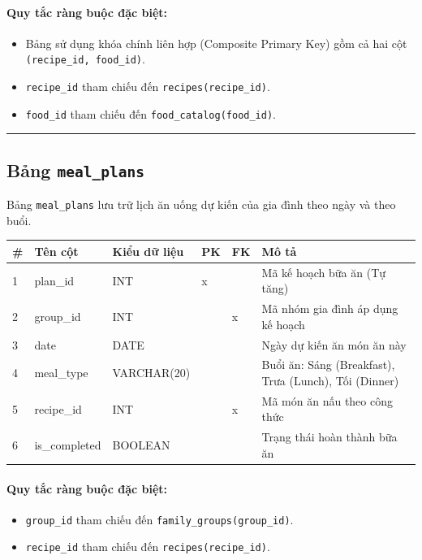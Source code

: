 \documentclass[12pt,a4paper]{article}
\begin{document}
\paragraph{Quy tắc ràng buộc đặc biệt:}
\begin{itemize}
    \item Bảng sử dụng khóa chính liên hợp (Composite Primary Key) gồm cả hai cột \texttt{(recipe\_id, food\_id)}.
    \item \texttt{recipe\_id} tham chiếu đến \texttt{recipes(recipe\_id)}.
    \item \texttt{food\_id} tham chiếu đến \texttt{food\_catalog(food\_id)}.
\end{itemize}

\vskip 0.5cm
\noindent\rule{\textwidth}{0.5pt}
\vskip 0.5cm

\subsection{Bảng \texttt{meal\_plans}}
Bảng \texttt{meal\_plans} lưu trữ lịch ăn uống dự kiến của gia đình theo ngày và theo buổi.

\begin{longtable}{|p{0.5cm}|p{3.4cm}|p{3.2cm}|p{0.7cm}|p{0.7cm}|p{3.6cm}|}
\hline
\textbf{\#} & \textbf{Tên cột} & \textbf{Kiểu dữ liệu} & \textbf{PK} & \textbf{FK} & \textbf{Mô tả} \\ \hline
\endhead
1 & plan\_id & INT & x & & Mã kế hoạch bữa ăn (Tự tăng) \\ \hline
2 & group\_id & INT & & x & Mã nhóm gia đình áp dụng kế hoạch \\ \hline
3 & date & DATE & & & Ngày dự kiến ăn món ăn này \\ \hline
4 & meal\_type & VARCHAR(20) & & & Buổi ăn: Sáng (Breakfast), Trưa (Lunch), Tối (Dinner) \\ \hline
5 & recipe\_id & INT & & x & Mã món ăn nấu theo công thức \\ \hline
6 & is\_completed & BOOLEAN & & & Trạng thái hoàn thành bữa ăn \\ \hline
\end{longtable}

\paragraph{Quy tắc ràng buộc đặc biệt:}
\begin{itemize}
    \item \texttt{group\_id} tham chiếu đến \texttt{family\_groups(group\_id)}.
    \item \texttt{recipe\_id} tham chiếu đến \texttt{recipes(recipe\_id)}.
\end{itemize}
\end{document}
